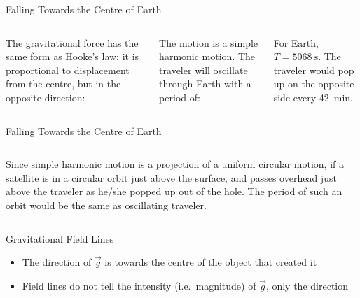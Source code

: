 \documentclass[12pt,compress,aspectratio=169]{beamer}
\begin{document}
\begin{frame}{Falling Towards the Centre of Earth}
  \begin{columns}

    The gravitational force has the same form as Hooke's law: it is
    proportional to displacement from the centre, but in the opposite
    direction:

    
    \vspace{-.1in}The motion is a simple harmonic motion. The traveler will
    oscillate through Earth with a period of:


    For Earth, $T=\SI{5068}\second$. The traveler would pop up on the opposite
    side every \SI{42}{min}.
  \end{columns}
\end{frame}




\begin{frame}{Falling Towards the Centre of Earth}
  \begin{columns}

    Since simple harmonic motion is a projection of a uniform circular motion,
    if a satellite is in a circular orbit just above the surface, and passes
    overhead just above the traveler as he/she popped up out of the hole. The
    period of such an orbit would be the same as oscillating traveler.
  \end{columns}
\end{frame}



\begin{frame}{Gravitational Field Lines}
  \begin{center}
  \end{center}
  \begin{itemize}
  \item The direction of $\vec g$ is towards the centre of the object that
    created it
  \item Field lines do not tell the intensity (i.e.\ magnitude) of $\vec g$,
    only the direction
  \end{itemize}
\end{frame}
\end{document}
